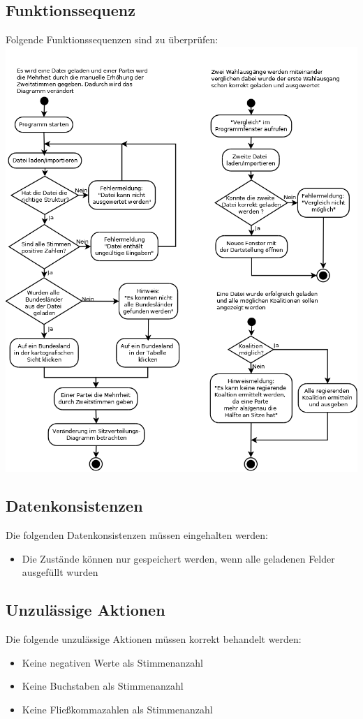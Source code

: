 \documentclass[10pt,a4paper]{article}
\begin{document}
\subsection{Funktionssequenz}
Folgende Funktionssequenzen sind zu überprüfen: \\
\includegraphics[scale=0.4]{Diagramm3}
\newpage
\subsection{Datenkonsistenzen}
Die folgenden Datenkonsistenzen müssen eingehalten werden:
\begin{itemize}
	\item Die Zustände können nur gespeichert werden, wenn alle geladenen Felder ausgefüllt wurden
\end{itemize}
\subsection{Unzulässige Aktionen}
Die folgende unzulässige Aktionen müssen korrekt behandelt werden:
\begin{itemize}
	\item Keine negativen Werte als Stimmenanzahl
	\item Keine Buchstaben als Stimmenanzahl
	\item Keine Fließkommazahlen als Stimmenanzahl
\end{itemize}
\end{document}
